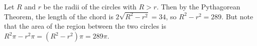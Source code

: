 Let $R$ and $r$ be the radii of the circles with $R>r$. Then by the Pythagorean Theorem, the length of the chord is $2\sqrt{R^2-r^2}=34$, so $R^2-r^2=289$. But note that the area of the region between the two circles is $R^2\pi-r^2\pi=\left(R^2-r^2\right)\pi=\boxed{289\pi}$.